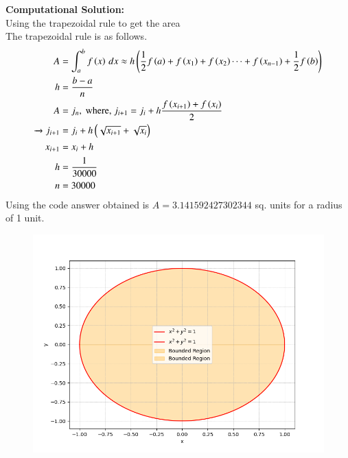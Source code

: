 \documentclass[journal,12pt,onecolumn]{IEEEtran}
\theoremstyle{remark}
\begin{document}
\textbf{Computational Solution:}\\
Using the trapezoidal rule to get the area\\
The trapezoidal rule is as follows.
\begin{align}
    A &= \int_a^b f\left(x\right)\, dx \approx h\left(\frac{1}{2}f\left(a\right) + f\left(x_1\right) + f\left(x_2\right) \cdots + f\left(x_{n-1}\right) + \frac{1}{2}f\left(b\right)\right)\\
    h &= \frac{b-a}{n}\\
    A &= j_n, \text{ where, } j_{i + 1} = j_i + h\frac{f\left(x_{i+1}\right) + f\left(x_i\right)}{2}\\ 
        \xrightarrow{} j_{i + 1} &= j_i + h\left(\sqrt{x_{i+1}}+\sqrt{x_{i}}\right)\\
    x_{i+1} &= x_i + h\\
    h&=\frac{1}{30000}\\
    n&=30000
\end{align}
Using the code answer obtained is $A=3.141592427302344$ sq. units for a radius of 1 unit.
\begin{figure}[ht]
    \centering
    \includegraphics[width=\columnwidth]{figs/fig_circle.png}
 \end{figure}
\end{document}
